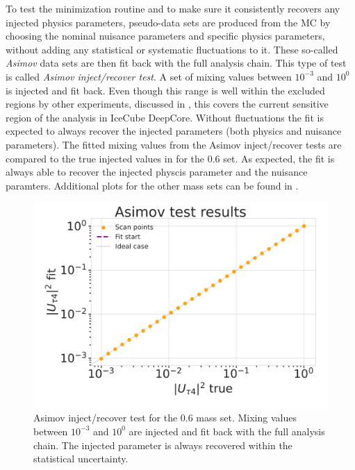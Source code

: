 To test the minimization routine and to make sure it consistently recovers any injected physics parameters, pseudo-data sets are produced from the MC by choosing the nominal nuisance parameters and specific physics parameters, without adding any statistical or systematic fluctuations to it. These so-called \textit{Asimov} data sets are then fit back with the full analysis chain. This type of test is called \textit{Asimov inject/recover test}. A set of mixing values between $10^{-3}$ and $10^{0}$ is injected and fit back. Even though this range is well within the excluded regions by other experiments, discussed in , this covers the current sensitive region of the analysis in IceCube DeepCore. Without fluctuations the fit is expected to always recover the injected parameters (both physics and nuisance parameters). The fitted mixing values from the Asimov inject/recover tests are compared to the true injected values in  for the \SI{0.6}{\gev} set. As expected, the fit is always able to recover the injected physcis parameter and the nuisance paramters. Additional plots for the other mass sets can be found in .

\begin{figure}[h]
    \includegraphics{figures/results/checks/asimov_scan_0.6_GeV-01.png}
	\caption[Asimov inject/recover test (\SI{0.6}{\gev})]{Asimov inject/recover test for the \SI{0.6}{\gev} mass set. Mixing values between $10^{-3}$ and $10^{0}$ are injected and fit back with the full analysis chain. The injected parameter is always recovered within the statistical uncertainty.}
\end{figure}


